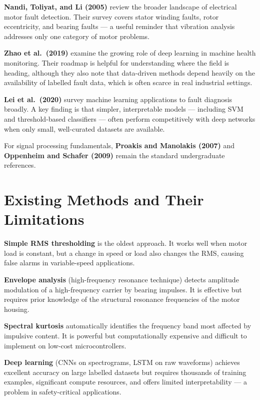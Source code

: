 \documentclass[12pt,a4paper]{article}
\begin{document}
\textbf{Nandi, Toliyat, and Li (2005)} \cite{nandi2005} review the
broader landscape of electrical motor fault detection. Their survey
covers stator winding faults, rotor eccentricity, and bearing
faults --- a useful reminder that vibration analysis addresses only
one category of motor problems.

\textbf{Zhao et al.\ (2019)} \cite{zhao2019} examine the growing
role of deep learning in machine health monitoring. Their roadmap
is helpful for understanding where the field is heading, although
they also note that data-driven methods depend heavily on the
availability of labelled fault data, which is often scarce in real
industrial settings.

\textbf{Lei et al.\ (2020)} \cite{lei2020} survey machine learning
applications to fault diagnosis broadly. A key finding is that
simpler, interpretable models --- including SVM and threshold-based
classifiers --- often perform competitively with deep networks when
only small, well-curated datasets are available.

For signal processing fundamentals, \textbf{Proakis and Manolakis
(2007)} \cite{proakis2007} and \textbf{Oppenheim and Schafer
(2009)} \cite{oppenheim2009} remain the standard undergraduate
references.

\section{Existing Methods and Their Limitations}

\textbf{Simple RMS thresholding} is the oldest approach. It works
well when motor load is constant, but a change in speed or load
also changes the RMS, causing false alarms in variable-speed
applications.

\textbf{Envelope analysis} (high-frequency resonance technique)
detects amplitude modulation of a high-frequency carrier by bearing
impulses. It is effective but requires prior knowledge of the
structural resonance frequencies of the motor housing.

\textbf{Spectral kurtosis} automatically identifies the frequency
band most affected by impulsive content. It is powerful but
computationally expensive and difficult to implement on low-cost
microcontrollers.

\textbf{Deep learning} (CNNs on spectrograms, LSTM on raw
waveforms) achieves excellent accuracy on large labelled datasets
but requires thousands of training examples, significant compute
resources, and offers limited interpretability --- a problem in
safety-critical applications.
\end{document}
